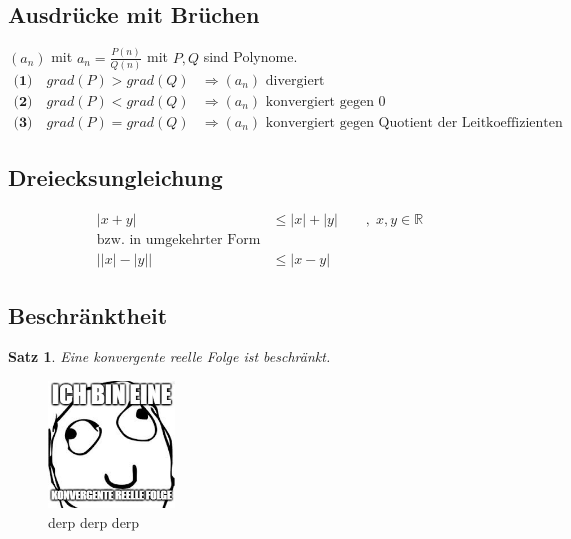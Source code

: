 \documentclass[12pt,a4paper]{report}%
\newtheorem{satz}{Satz}[section]
\numberwithin{equation}{section}
\newcommand{\R}{\mathbb{R}} %
\numberwithin{equation}{subsection}
\begin{document}
  \subsection{Ausdrücke mit Brüchen}
  $(a_n)$ mit $a_n = \frac{P(n)}{Q(n)}$ mit $P,Q$ sind Polynome.
  \begin{align*}
    \textbf{(1)}\quad grad(P) > grad(Q) &\Rightarrow (a_n) \text{ divergiert} \\
    \textbf{(2)}\quad grad(P) < grad(Q) &\Rightarrow (a_n) \text{ konvergiert gegen } 0\\
    \textbf{(3)}\quad grad(P) = grad(Q) &\Rightarrow (a_n) \text{ konvergiert gegen Quotient der Leitkoeffizienten}
  \end{align*}   
  
  \subsection{Dreiecksungleichung}
  \begin{align}
    |x+y| &\leq |x| + |y| \qquad ,\; x,y \in \R \\
    \text{bzw. in umgekehrter Form} \nonumber \\
    \big| |x| - |y| \big| &\leq |x-y|
  \end{align}
  
  \subsection{Beschränktheit}
  \begin{satz}
    Eine konvergente reelle Folge ist beschränkt.
  \end{satz}
  \begin{figure}[H] 
	  \centering
	  \includegraphics[width=0.3\textwidth]{beschraenkt.jpg}
	  \caption{derp derp derp}
	  \label{fig:folge_epsilon}
	\end{figure}
  
\end{document}
